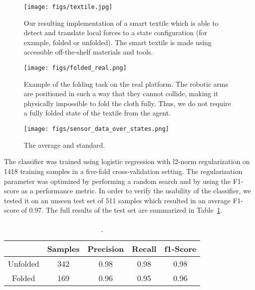 \documentclass[applsci,article,accept,moreauthors,pdftex]{Definitions/mdpi}
\begin{document}
\begin{figure}[H]
\centering
\texttt{[image: figs/textile.jpg]}
\caption{Our resulting implementation of a smart textile which is able to detect and translate local forces to a state configuration (for example, folded or unfolded). The smart textile is made using accessible off-the-shelf materials and tools.}
\label{fig:textile_real}
\end{figure}
\unskip

\begin{figure}[H]
\centering
\texttt{[image: figs/folded\_real.png]}
\caption{Example of the folding task on the real platform. The robotic arms are positioned in such a way that they cannot collide, making it physically impossible to fold the cloth fully. Thus, we do not require a fully folded state of the textile from the agent.}
\label{fig:folded_real}
\end{figure}
\unskip

\begin{figure}[H]
\centering
\texttt{[image: figs/sensor\_data\_over\_states.png]}
\caption{The average and standard. }
\label{fig:sensor_data}
\end{figure}

The classifier was trained using logistic regression with l2-norm regularization on 1418 training samples in a five-fold cross-validation setting. The regularization parameter was optimized by performing a random search and by using the F1-score as a performance metric. In order to verify the usability of the classifier, we tested it on an unseen test set of 511 samples which resulted in an average F1-score of $0.97$. The full results of the test set are summarized in Table~\ref{table:classifier_results}.
\begin{table}[H]
\centering
\caption{.}
\label{table:classifier_results}
\begin{tabular}{ccccc}
\toprule
& \textbf{Samples} & \textbf{Precision} & \textbf{Recall} & \textbf{f1-Score} \\
\midrule
Unfolded &  342 &     0.98    &  0.98  &    0.98 \\
Folded & 169  &       0.96  & 0.95  &    0.96 \\
\bottomrule
\end{tabular}
\end{table}
\end{document}

